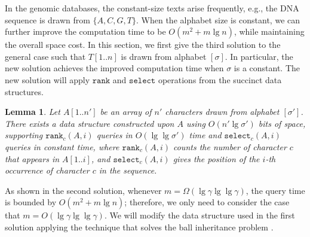 \documentclass[smallabstract,smallcaptions]{dccpaper}
\newtheorem{lemma}{Lemma}
\def\idtt#1{\ensuremath{\mathtt{#1}}}
\def\rank{\idtt{rank}}
\def\select{\idtt{select}}
\begin{document}

In the genomic databases, the constant-size texts arise frequently, e.g., the DNA sequence is drawn from $\{A, C, G, T\}$.
When the alphabet size is constant, we can further improve the computation time to be $O(m^2 + m\lg n)$, while maintaining the overall space cost.
In this section, we first give the third solution to the general case such that $T[1..n]$ is drawn from alphabet $[\sigma]$.
In particular, the new solution achieves the improved computation time when $\sigma$ is a constant.
The new solution will apply $\rank$ and $\select$ operations from the succinct data structures.

\begin{lemma}\cite{golynski2006rank}
	\label{lem:sel-rank}
	Let $A[1..n']$ be an array of $n'$ characters drawn from alphabet $[\sigma']$. There exists a data structure constructed upon $A$ using $O(n'\lg \sigma')$ bits of space, supporting $\rank_c(A, i)$ queries in $O(\lg \lg \sigma')$ time and $\select_c(A, i)$ queries in constant time, where $\rank_c(A, i)$ counts the number of character $c$ that appears in $A[1..i]$, and $\select_c(A, i)$ gives the position of the $i$-th occurrence of character $c$ in the sequence.
\end{lemma}

As shown in the second solution, whenever $m=\Omega(\lg \gamma \lg \lg \gamma)$, the query time is bounded by $O(m^2+m\lg n)$; therefore, we only need to consider the case that $m=O(\lg \gamma \lg \lg \gamma)$.
We will modify the data structure used in the first solution applying the technique that solves the ball inheritance problem \cite{chan2011orthogonal}.
%
\end{document}
